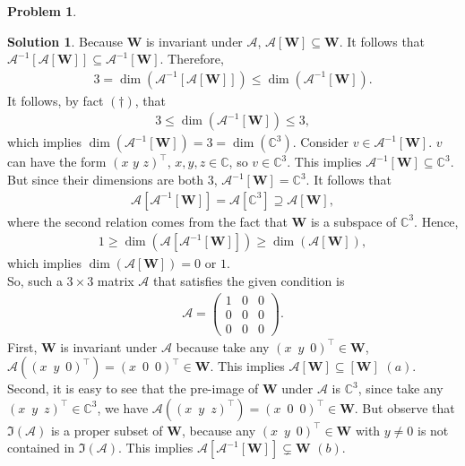 \documentclass{article}
\theoremstyle{definition}
\newtheorem*{prob*}{Problem}
\newtheorem*{sln*}{Solution}
\newcommand{\W}{\mathbf{W}}
\begin{document}
\begin{prob*}
\begin{sln*}
		\noindent Because $\W$ is invariant under $\mathcal{A}$, $\mathcal{A}[\W] \subseteq \W$. It follows that $\mathcal{A}^{-1}\left[ \mathcal{A}[\W] \right] \subseteq \mathcal{A}^{-1}[\W]$. Therefore,
		\begin{align*}
		3 = \dim\left( \mathcal{A}^{-1}\left[ \mathcal{A}[\W] \right]  \right) \leq \dim\left( \mathcal{A}^{-1}[\W]  \right).
		\end{align*}
		It follows, by fact $(\dagger)$, that
		\begin{align*}
		3 \leq \dim\left( \mathcal{A}^{-1}[\W]  \right) \leq 3,
		\end{align*}
		which implies $\dim\left( \mathcal{A}^{-1}[\W]  \right) = 3 = \dim(\mathbb{C}^3)$. Consider $v\in \mathcal{A}^{-1}[\W] $. $v$ can have the form $(x\,\,y\,\,z)^\top$, $x,y,z\in \mathbb{C}$, so $v\in\mathbb{C}^3$. This implies $\mathcal{A}^{-1}[\W] \subseteq \mathbb{C}^3$. But since their dimensions are both 3, $\mathcal{A}^{-1}[\W] = \mathbb{C}^3$. It follows that
		\begin{align*}
		\mathcal{A}\left[ \mathcal{A}^{-1}[\W] \right] = \mathcal{A}[\mathbb{C}^3] \supseteq \mathcal{A}[\W],
		\end{align*}
		where the second relation comes from the fact that $\W$ is a subspace of $\mathbb{C}^3$. Hence,
		\begin{align*}
		1 \geq \dim\left( \mathcal{A}\left[ \mathcal{A}^{-1}[\W] \right] \right) \geq \dim\left( \mathcal{A}[\W] \right),
		\end{align*}
		which implies $\dim(\mathcal{A}[\W]) = 0$ or $1$.\\
		
		\noindent So, such a $3\times 3$ matrix $\mathcal{A}$ that satisfies the given condition is
		\begin{align*}
		\mathcal{A} = \begin{pmatrix}
		1&0&0\\
		0&0&0\\
		0&0&0
		\end{pmatrix}.
		\end{align*}
		First, $\W$ is invariant under $\mathcal{A}$ because take any $(x\,\,\,y\,\,\,0)^\top \in \W$, $\mathcal{A}\left((x\,\,\,y\,\,\,0)^\top\right) = (x\,\,\,0\,\,\,0)^\top \in \W$. This implies $\mathcal{A}[\W] \subseteq [\W]$ $(a)$. \\
		
		\noindent Second, it is easy to see that the pre-image of $\W$ under $\mathcal{A}$ is $\mathbb{C}^3$, since take any $(x\,\,\,y\,\,\,z)^\top \in \mathbb{C}^3$, we have $\mathcal{A}\left((x\,\,\,y\,\,\,z)^\top\right) = (x\,\,\,0\,\,\,0)^\top \in \W$. But observe that $\Im(\mathcal{A})$ is a proper subset of $\W$, because any $(x\,\,\,y\,\,\,0)^\top \in \W$ with $y\neq 0$ is not contained in $\Im(\mathcal{A})$. This implies $\mathcal{A}\left[\mathcal{A}^{-1}[\W]\right] \subsetneq \W$  $(b)$.\\ 
		

\end{sln*}
\end{prob*}
\end{document}
